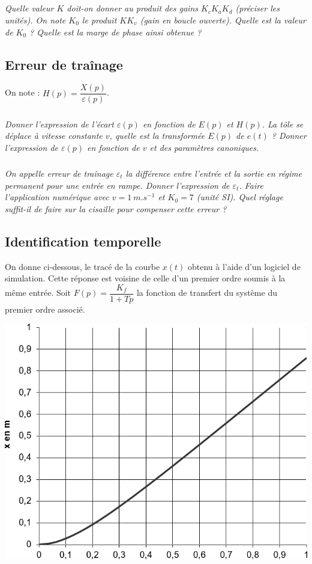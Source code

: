 \documentclass[10pt,fleqn]{article} %
\begin{document}
\begin{multicols}{2}
\subparagraph{}\textit{Quelle valeur $K$ doit-on donner au produit des gains $K_c K_a K_d$ (préciser les unités).
On note $K_0$ le produit $KK_v$ (gain en boucle ouverte). Quelle est la valeur de $K_0$ ?
Quelle est la marge de phase ainsi obtenue ?}


\subsection*{Erreur de traînage}
On note :   $H(p)=\dfrac{X(p)}{\varepsilon(p)}$.

\subparagraph{}\textit{Donner l’expression de l’écart $\varepsilon(p)$ en fonction de $E(p)$ et $H(p)$. La tôle se déplace à vitesse constante $v$, quelle est la transformée $E(p)$ de $e(t)$ ? Donner l’expression de $\varepsilon(p)$ en fonction de $v$ et des paramètres canoniques.}

\subparagraph{}\textit{On appelle erreur de traînage $\varepsilon_t$ la différence entre l’entrée et la sortie en régime permanent pour une entrée en rampe. Donner l’expression de $\varepsilon_t$. Faire l’application numérique avec $v = \SI{1}{m.s^{-1}}$ et $K_0 = 7$ (unité SI).	
Quel réglage suffit-il de faire sur la cisaille pour compenser cette erreur ?}


\subsection*{Identification temporelle}
On donne ci-dessous, le tracé de la courbe $x(t)$ obtenu à l’aide d’un logiciel de simulation.
Cette réponse est voisine de celle d’un premier ordre soumis à la même entrée.
Soit $F(p)=\dfrac{K_f}{1+Tp}$ la fonction de transfert du système du premier ordre associé.


\begin{center}
\includegraphics[width=\linewidth]{images/fig_03}
\end{center}



\end{multicols}
\end{document}
